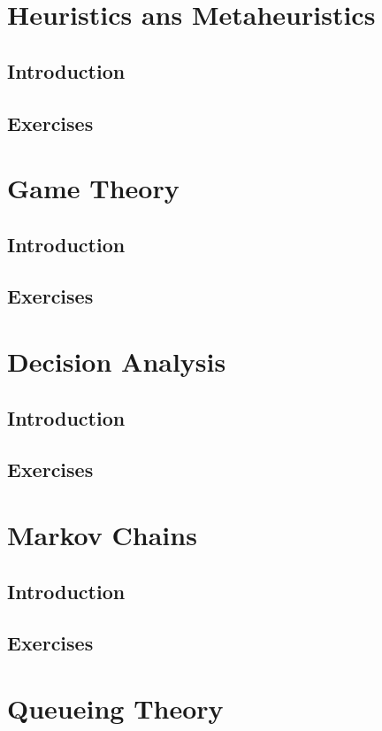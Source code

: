 \documentclass[10pt, twocolumn]{book}
\begin{document}
\part{Heuristics ans Metaheuristics}
	\chapter{Introduction}

	\chapter{Exercises}

\part{Game Theory}
	\chapter{Introduction}

	\chapter{Exercises}

\part{Decision Analysis}
	\chapter{Introduction}

	\chapter{Exercises}

\part{Markov Chains}
	\chapter{Introduction}

	\chapter{Exercises}

\part{Queueing Theory}
\end{document}
